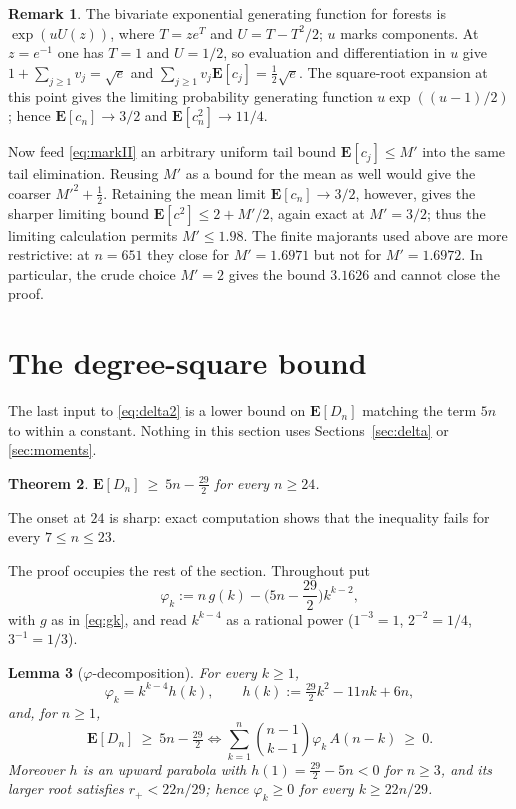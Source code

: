 \documentclass[11pt,a4paper]{amsart}
\theoremstyle{plain}
\newtheorem{theorem}{Theorem}[section]
\newtheorem{lemma}[theorem]{Lemma}
\theoremstyle{definition}
\newtheorem{remark}[theorem]{Remark}
\newcommand{\EX}{\mathbf{E}}
\begin{document}
\begin{remark}\label{rem:tight}
The bivariate exponential generating function for forests is
$\exp(uU(z))$, where $T=ze^T$ and $U=T-T^2/2$; $u$ marks components. At
$z=e^{-1}$ one has $T=1$ and $U=1/2$, so evaluation and differentiation in $u$
give $1+\sum_{j\ge1}v_j=\sqrt e$ and
$\sum_{j\ge1}v_j\EX[c_j]=\tfrac12\sqrt e$. The square-root expansion at this
point gives the limiting probability generating function
$u\exp((u-1)/2)$ \cite[Chapter~VII]{FS2009}; hence
$\EX[c_n]\to3/2$ and $\EX[c_n^2]\to11/4$.

Now feed \eqref{eq:markII} an arbitrary uniform tail bound
$\EX[c_j]\le M'$ into the same tail elimination. Reusing $M'$ as a bound for
the mean as well would give the coarser $M'^2+\tfrac12$. Retaining the mean
limit $\EX[c_n]\to3/2$, however, gives the sharper limiting bound
$\EX[c^2]\le 2+M'/2$, again exact at $M'=3/2$; thus the limiting calculation
permits $M'\le1.98$. The finite majorants used above are more restrictive: at
$n=651$ they close for $M'=1.6971$ but not for $M'=1.6972$. In particular, the
crude choice $M'=2$ gives the bound $3.1626$ and cannot close the proof.
\end{remark}

\section{The degree-square bound}\label{sec:degsq}

The last input to \eqref{eq:delta2} is a lower bound on $\EX[D_n]$ matching the
term $5n$ to within a constant. Nothing in this section uses
Sections~\ref{sec:delta} or \ref{sec:moments}.

\begin{theorem}\label{thm:D}
$\EX[D_n]\ \ge\ 5n-\tfrac{29}{2}$ for every $n \ge 24$.
\end{theorem}

The onset at $24$ is sharp: exact computation shows that the inequality fails
for every $7\le n\le23$.

The proof occupies the rest of the section. Throughout put
\begin{equation}\label{eq:phidef}
  \varphi_k := n\,g(k)-\Big(5n-\frac{29}{2}\Big)k^{k-2},
\end{equation}
with $g$ as in \eqref{eq:gk}, and read $k^{k-4}$ as a rational power
($1^{-3}=1$, $2^{-2}=1/4$, $3^{-1}=1/3$).

\begin{lemma}[$\varphi$-decomposition]\label{lem:C1}
For every $k \ge 1$,
\[
  \varphi_k = k^{k-4}h(k), \qquad h(k) := \tfrac{29}{2}k^2-11nk+6n,
\]
and, for $n \ge 1$,
\begin{equation}\label{eq:star2}
  \EX[D_n]\ \ge\ 5n-\tfrac{29}{2}
  \iff
  \sum_{k=1}^{n}\binom{n-1}{k-1}\varphi_k\,A(n-k)\ \ge\ 0 .
\end{equation}
Moreover $h$ is an upward parabola with $h(1)=\tfrac{29}{2}-5n<0$ for $n \ge 3$,
and its larger root satisfies $r_+ < 22n/29$; hence $\varphi_k \ge 0$ for every
$k \ge 22n/29$.
\end{lemma}
\end{document}
